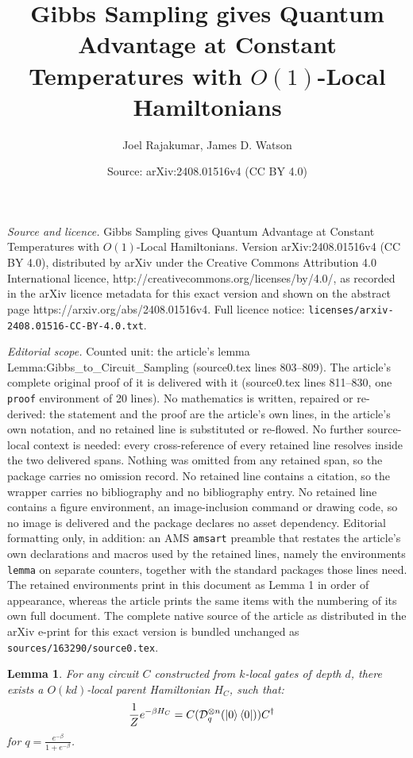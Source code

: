 \documentclass[10pt,a4paper]{amsart}
\title{Gibbs Sampling gives Quantum Advantage at Constant Temperatures with $O(1)$-Local Hamiltonians}
\author{Joel Rajakumar, James D. Watson}
\date{Source: arXiv:2408.01516v4 (CC BY 4.0)}
\newtheorem{lemma}{Lemma}
\newcommand{\cD}{\mathcal{D}}
\newcommand{\ox}{\otimes}
\begin{document}
\maketitle

\noindent\emph{Source and licence.} Gibbs Sampling gives Quantum Advantage at Constant Temperatures with $O(1)$-Local Hamiltonians. Version arXiv:2408.01516v4 (CC BY 4.0), distributed by arXiv under the Creative Commons Attribution 4.0 International licence, http://creativecommons.org/licenses/by/4.0/, as recorded in the arXiv licence metadata for this exact version and shown on the abstract page https://arxiv.org/abs/2408.01516v4. Full licence notice: \texttt{licenses/arxiv-2408.01516-CC-BY-4.0.txt}.\par\smallskip

\noindent\textit{Editorial scope.} Counted unit: the article's lemma Lemma:Gibbs\_to\_Circuit\_Sampling (source0.tex lines 803--809). The article's complete original proof of it is delivered with it (source0.tex lines 811--830, one \texttt{proof} environment of 20 lines). No mathematics is written, repaired or re-derived: the statement and the proof are the article's own lines, in the article's own notation, and no retained line is substituted or re-flowed.  No further source-local context is needed: every cross-reference of every retained line resolves inside the two delivered spans.  Nothing was omitted from any retained span, so the package carries no omission record.  No retained line contains a citation, so the wrapper carries no bibliography and no bibliography entry.  No retained line contains a figure environment, an image-inclusion command or drawing code, so no image is delivered and the package declares no asset dependency.  Editorial formatting only, in addition: an AMS \texttt{amsart} preamble that restates the article's own declarations and macros used by the retained lines, namely the environments \texttt{lemma} on separate counters, together with the standard packages those lines need.  The retained environments print in this document as Lemma 1 in order of appearance, whereas the article prints the same items with the numbering of its own full document.  The complete native source of the article as distributed in the arXiv e-print for this exact version is bundled unchanged as \texttt{sources/163290/source0.tex}.
	\begin{lemma}\label{Lemma:Gibbs_to_Circuit_Sampling}
		For any circuit $C$ constructed from $k$-local gates of depth $d$, there exists a $O(kd)$-local parent Hamiltonian $H_C$, such that:
  \begin{align*}
      \frac{1}{Z}e^{-\beta H_C} &= C(\cD_q^{\ox n}(\ket{0}\bra{0}))C^\dagger
  \end{align*}
  for $q = \frac{e^{-\beta}}{1+e^{-\beta}}$.
	\end{lemma}
\end{document}
